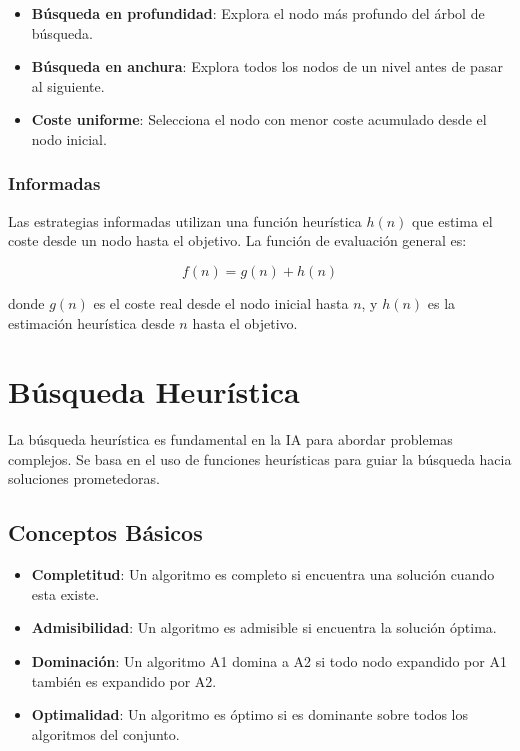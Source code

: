 \documentclass[12pt,a4paper]{report}
\begin{document}
	\begin{itemize}
		\item \textbf{Búsqueda en profundidad}: Explora el nodo más profundo del árbol de búsqueda.
		\item \textbf{Búsqueda en anchura}: Explora todos los nodos de un nivel antes de pasar al siguiente.
		\item \textbf{Coste uniforme}: Selecciona el nodo con menor coste acumulado desde el nodo inicial.
	\end{itemize}
	
	\subsubsection{Informadas}
	
	Las estrategias informadas utilizan una función heurística $h(n)$ que estima el coste desde un nodo hasta el objetivo. La función de evaluación general es:
	
	\[ f(n) = g(n) + h(n) \]
	
	donde $g(n)$ es el coste real desde el nodo inicial hasta $n$, y $h(n)$ es la estimación heurística desde $n$ hasta el objetivo.
	
	\section{Búsqueda Heurística}
	
	La búsqueda heurística es fundamental en la IA para abordar problemas complejos. Se basa en el uso de funciones heurísticas para guiar la búsqueda hacia soluciones prometedoras.
	
	\subsection{Conceptos Básicos}
	
	\begin{itemize}
		\item \textbf{Completitud}: Un algoritmo es completo si encuentra una solución cuando esta existe.
		\item \textbf{Admisibilidad}: Un algoritmo es admisible si encuentra la solución óptima.
		\item \textbf{Dominación}: Un algoritmo A1 domina a A2 si todo nodo expandido por A1 también es expandido por A2.
		\item \textbf{Optimalidad}: Un algoritmo es óptimo si es dominante sobre todos los algoritmos del conjunto.
	\end{itemize}
	
\end{document}
